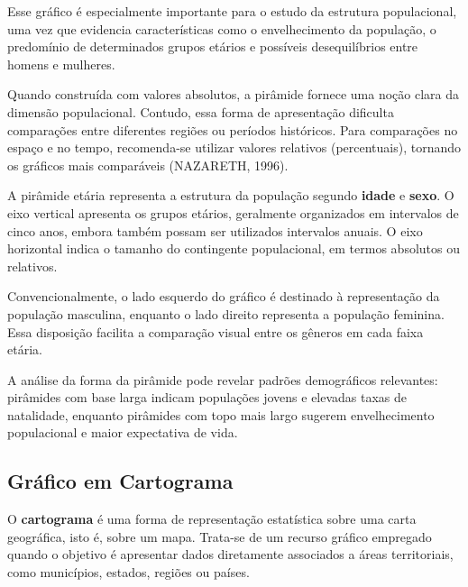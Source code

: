 Esse gráfico é especialmente importante para o estudo da estrutura populacional,
uma vez que evidencia características como o envelhecimento da população,
o predomínio de determinados grupos etários e possíveis desequilíbrios entre
homens e mulheres. \vskip0.3cm

Quando construída com valores absolutos, a pirâmide fornece uma noção clara da
dimensão populacional. Contudo, essa forma de apresentação dificulta comparações
entre diferentes regiões ou períodos históricos. Para comparações no espaço e
no tempo, recomenda-se utilizar valores relativos (percentuais), tornando os
gráficos mais comparáveis (NAZARETH, 1996). \vskip0.3cm

A pirâmide etária representa a estrutura da população segundo \textbf{idade} e
\textbf{sexo}. O eixo vertical apresenta os grupos etários, geralmente organizados
em intervalos de cinco anos, embora também possam ser utilizados intervalos anuais.
O eixo horizontal indica o tamanho do contingente populacional, em termos absolutos
ou relativos. \vskip0.3cm

Convencionalmente, o lado esquerdo do gráfico é destinado à representação da
população masculina, enquanto o lado direito representa a população feminina.
Essa disposição facilita a comparação visual entre os gêneros em cada faixa etária. \vskip0.3cm

A análise da forma da pirâmide pode revelar padrões demográficos relevantes:
pirâmides com base larga indicam populações jovens e elevadas taxas de natalidade,
enquanto pirâmides com topo mais largo sugerem envelhecimento populacional e maior
expectativa de vida.



\newpage
\subsection{Gráfico em Cartograma}

O \textbf{cartograma} é uma forma de representação estatística sobre uma carta
geográfica, isto é, sobre um mapa. Trata-se de um recurso gráfico empregado quando
o objetivo é apresentar dados diretamente associados a áreas territoriais,
como municípios, estados, regiões ou países. \vskip0.3cm

